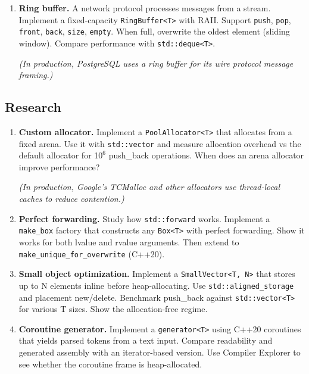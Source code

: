 \begin{enumerate}
\item \textbf{Ring buffer.} A network protocol processes messages from a stream. Implement a fixed-capacity \texttt{RingBuffer<T>} with RAII. Support \texttt{push}, \texttt{pop}, \texttt{front}, \texttt{back}, \texttt{size}, \texttt{empty}. When full, overwrite the oldest element (sliding window). Compare performance with \texttt{std::deque<T>}.

    \textit{(In production, PostgreSQL uses a ring buffer for its wire protocol message framing.)}
\end{enumerate}

\subsection{Research}

\begin{enumerate}
\item \textbf{Custom allocator.} Implement a \texttt{PoolAllocator<T>} that allocates from a fixed arena. Use it with \texttt{std::vector} and measure allocation overhead vs the default allocator for 1$0^{6}$ push\_back operations. When does an arena allocator improve performance?

    \textit{(In production, Google's TCMalloc and other allocators use thread-local caches to reduce contention.)}

\item \textbf{Perfect forwarding.} Study how \texttt{std::forward} works. Implement a \texttt{make\_box} factory that constructs any \texttt{Box<T>} with perfect forwarding. Show it works for both lvalue and rvalue arguments. Then extend to \texttt{make\_unique\_for\_overwrite} (C++20).

\item \textbf{Small object optimization.} Implement a \texttt{SmallVector<T, N>} that stores up to N elements inline before heap-allocating. Use \texttt{std::aligned\_storage} and placement new/delete. Benchmark push\_back against \texttt{std::vector<T>} for various T sizes. Show the allocation-free regime.

\item \textbf{Coroutine generator.} Implement a \texttt{generator<T>} using C++20 coroutines that yields parsed tokens from a text input. Compare readability and generated assembly with an iterator-based version. Use Compiler Explorer to see whether the coroutine frame is heap-allocated.
\end{enumerate}

